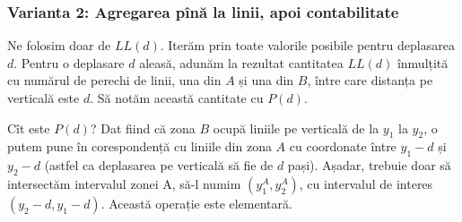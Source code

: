 \documentclass[../main.tex]{subfiles}
\begin{document}
\subsubsection*{Varianta 2: Agregarea pînă la linii, apoi contabilitate}

Ne folosim doar de $LL(d)$. Iterăm prin toate valorile posibile pentru deplasarea $d$. Pentru o deplasare $d$ aleasă, adunăm la rezultat cantitatea $LL(d)$ înmulțită cu numărul de perechi de linii, una din $A$ și una din $B$, între care distanța pe verticală este $d$. Să notăm această cantitate cu $P(d)$.

Cît este $P(d)$? Dat fiind că zona $B$ ocupă liniile pe verticală de la $y_1$ la $y_2$, o putem pune în corespondență cu liniile din zona $A$ cu coordonate între $y_1-d$ și $y_2-d$ (astfel ca deplasarea pe verticală să fie de $d$ pași). Așadar, trebuie doar să intersectăm intervalul zonei A, să-l numim $(y^A_1, y^A_2)$, cu intervalul de interes $(y_2 - d, y_1 - d)$. Această operație este elementară.
\end{document}
